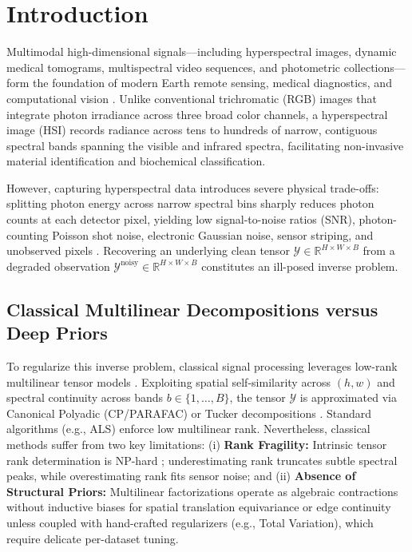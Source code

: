 \section{Introduction}
\label{sec:introduction}
\setcounter{page}{1}

Multimodal high-dimensional signals---including hyperspectral images, dynamic medical tomograms, multispectral video sequences, and photometric collections---form the foundation of modern Earth remote sensing, medical diagnostics, and computational vision \citep{bioucas2012hyperspectral, kolda2009tensor}. Unlike conventional trichromatic (RGB) images that integrate photon irradiance across three broad color channels, a hyperspectral image (HSI) records radiance across tens to hundreds of narrow, contiguous spectral bands spanning the visible and infrared spectra, facilitating non-invasive material identification and biochemical classification.

However, capturing hyperspectral data introduces severe physical trade-offs: splitting photon energy across narrow spectral bins sharply reduces photon counts at each detector pixel, yielding low signal-to-noise ratios (SNR), photon-counting Poisson shot noise, electronic Gaussian noise, sensor striping, and unobserved pixels \citep{bioucas2012hyperspectral, arad2016sparse}. Recovering an underlying clean tensor $\mathcal{Y} \in \mathbb{R}^{H \times W \times B}$ from a degraded observation $\mathcal{Y}^\text{noisy} \in \mathbb{R}^{H \times W \times B}$ constitutes an ill-posed inverse problem.

\subsection{Classical Multilinear Decompositions versus Deep Priors}
To regularize this inverse problem, classical signal processing leverages low-rank multilinear tensor models \citep{kolda2009tensor}. Exploiting spatial self-similarity across $(h, w)$ and spectral continuity across bands $b \in \{1, \dots, B\}$, the tensor $\mathcal{Y}$ is approximated via Canonical Polyadic (CP/PARAFAC) \citep{harshman1970foundations} or Tucker decompositions \citep{tucker1966some}. Standard algorithms (e.g., ALS) enforce low multilinear rank. Nevertheless, classical methods suffer from two key limitations: (i) \textbf{Rank Fragility:} Intrinsic tensor rank determination is NP-hard \citep{kolda2009tensor, heckel2020deeptensor}; underestimating rank truncates subtle spectral peaks, while overestimating rank fits sensor noise; and (ii) \textbf{Absence of Structural Priors:} Multilinear factorizations operate as algebraic contractions without inductive biases for spatial translation equivariance or edge continuity unless coupled with hand-crafted regularizers (e.g., Total Variation), which require delicate per-dataset tuning.

